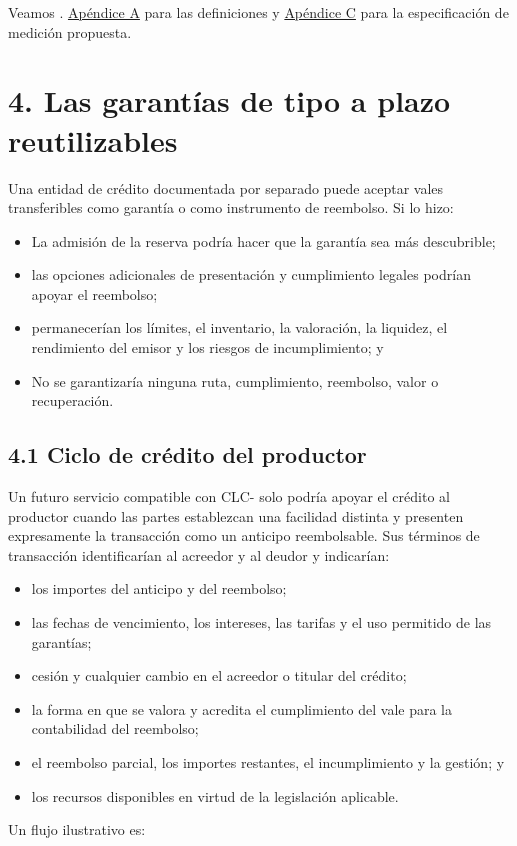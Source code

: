 \documentclass[11pt]{article}
\begin{document}
Veamos . \href{https://docs.cosmolocal.credit/es/white-paper/appendix-a-math-box}{Apéndice A} para las definiciones y \href{https://docs.cosmolocal.credit/es/white-paper/appendix-c-kpi-definitions}{Apéndice C} para la especificación de medición propuesta.


\section*{4. Las garantías de tipo a plazo reutilizables}

Una entidad de crédito documentada por separado puede aceptar vales transferibles como garantía o como instrumento de reembolso. Si lo hizo:

\begin{itemize}[leftmargin=*]
\item La admisión de la reserva podría hacer que la garantía sea más descubrible;
\item las opciones adicionales de presentación y cumplimiento legales podrían apoyar el reembolso;
\item permanecerían los límites, el inventario, la valoración, la liquidez, el rendimiento del emisor y los riesgos de incumplimiento; y
\item No se garantizaría ninguna ruta, cumplimiento, reembolso, valor o recuperación.
\end{itemize}
\subsection*{4.1 Ciclo de crédito del productor}

Un futuro servicio compatible con CLC- solo podría apoyar el crédito al productor cuando las partes establezcan una facilidad distinta y presenten expresamente la transacción como un anticipo reembolsable. Sus términos de transacción identificarían al acreedor y al deudor y indicarían:

\begin{itemize}[leftmargin=*]
\item los importes del anticipo y del reembolso;
\item las fechas de vencimiento, los intereses, las tarifas y el uso permitido de las garantías;
\item cesión y cualquier cambio en el acreedor o titular del crédito;
\item la forma en que se valora y acredita el cumplimiento del vale para la contabilidad del reembolso;
\item el reembolso parcial, los importes restantes, el incumplimiento y la gestión; y
\item los recursos disponibles en virtud de la legislación aplicable.
\end{itemize}
Un flujo ilustrativo es:
\end{document}
